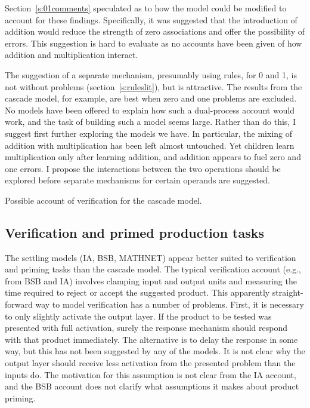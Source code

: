 Section~\ref{s:01comments} speculated as to how the model could be modified
to account for these findings.  Specifically, it was suggested that the
introduction of addition would reduce the strength of zero associations and
offer the possibility of  errors. This suggestion is hard to
evaluate as no accounts have been given of how addition and multiplication
interact.

The suggestion of a separate mechanism, presumably using rules, for 0 and
1, is not without problems (section~\ref{s:ruleslit}), but is attractive.
The results from the cascade model, for example, are best when zero and one
problems are excluded. No models have been offered to explain how such a
dual-process account would work, and the task of building such a model
seems large.
Rather than do this, I suggest first further exploring the models we have.
In particular, the mixing of addition with multiplication has been left
almost untouched. Yet children learn multiplication only after learning
addition, and addition appears to fuel zero and one errors. I propose the
interactions between the two operations should be explored before separate
mechanisms for certain operands are suggested.




\begin{fancyfigure}
\centerline{}
\caption{Possible account of verification for the cascade model.}
\label{f:possverify}
\end{fancyfigure}

\subsection{Verification and primed production tasks}\label{s:verifyres}

The settling models (IA, BSB, MATHNET) appear better suited to verification
and priming tasks than the cascade model.  The typical verification account
(e.g., from BSB and IA) involves clamping input and output units and
measuring the time required to reject or accept the suggested product. This
apparently straight-forward way to model verification has a number of
problems.  First, it is necessary to only slightly activate the output
layer.  If the product to be tested was presented with full activation,
surely the response mechanism should respond with that product immediately.
The alternative is to delay the response in some way, but this has not been
suggested by any of the models. It is not clear why the output layer should
receive less activation from the presented problem than the inputs do. The
motivation for this assumption is not clear from the IA account, and the
BSB account does not clarify what assumptions it makes about product
priming.

